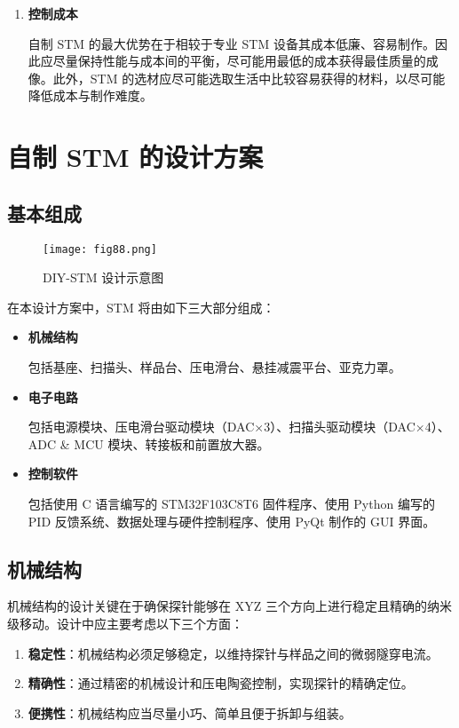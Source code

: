 \documentclass{article}
\begin{document}
\begin{spacing}{1.625}
\begin{enumerate}
		
		\item \textbf{控制成本}\par
		\qquad 自制 STM 的最大优势在于相较于专业 STM 设备其成本低廉、容易制作。因此应尽量保持性能与成本间的平衡，尽可能用最低的成本获得最佳质量的成像。此外，STM 的选材应尽可能选取生活中比较容易获得的材料，以尽可能降低成本与制作难度。
		
	\end{enumerate}
	
	
	
	
	
	
	
	
	
	
	\clearpage
\section{自制 STM 的设计方案}
	\subsection{基本组成}
		\begin{figure}[htbp]
			\centering 
			\texttt{[image: fig88.png]}
			\caption{DIY-STM 设计示意图}
		\end{figure}	
		
		在本设计方案中，STM 将由如下三大部分组成：
		
		\begin{itemize}
			\item \textbf{机械结构}\par
			\qquad 包括基座、扫描头、样品台、压电滑台、悬挂减震平台、亚克力罩。
			
			\item \textbf{电子电路}\par
			\qquad 包括电源模块、压电滑台驱动模块（DAC$\times$3）、扫描头驱动模块（DAC$\times$4）、ADC \& MCU 模块、转接板和前置放大器。
			
			
			\item \textbf{控制软件}\par
			\qquad 包括使用 C 语言编写的 STM32F103C8T6 固件程序、使用 Python 编写的 PID 反馈系统、数据处理与硬件控制程序、使用 PyQt 制作的 GUI 界面。
			
		\end{itemize}
	
	
	
	
	
	
	
	
	\subsection{机械结构}
		机械结构的设计关键在于确保探针能够在 XYZ 三个方向上进行稳定且精确的纳米级移动。设计中应主要考虑以下三个方面：
		\begin{enumerate}
			\item \textbf{稳定性}：机械结构必须足够稳定，以维持探针与样品之间的微弱隧穿电流。
			\item \textbf{精确性}：通过精密的机械设计和压电陶瓷控制，实现探针的精确定位。
			\item \textbf{便携性}：机械结构应当尽量小巧、简单且便于拆卸与组装。
		\end{enumerate}
		

\end{spacing}
\end{document}
